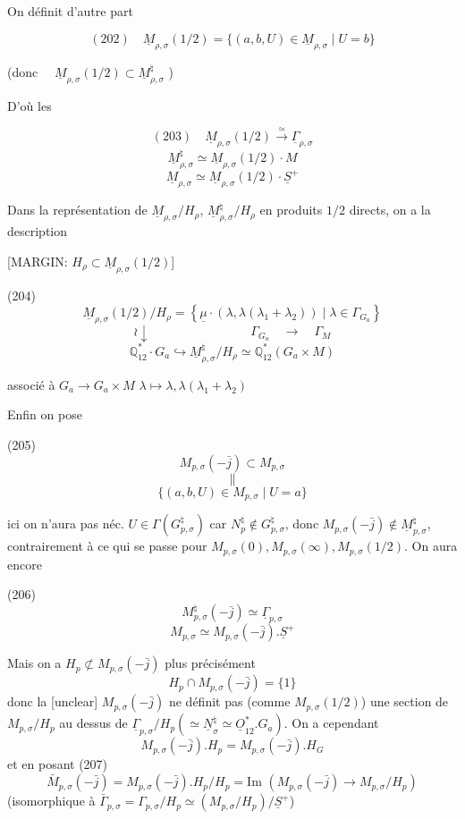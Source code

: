On définit d'autre part

$$ (202) \quad \underline{M}_{\rho, \sigma}(1/2) = \{ (a, b, U) \in \underline{M}_{\rho, \sigma} \mid U = b \} $$

(donc $\quad \underline{M}_{\rho, \sigma}(1/2) \subset \underline{M}_{\rho, \sigma}^\natural$ )

D'où les

$$ (203) \quad \underline{M}_{\rho, \sigma}(1/2) \overset{\simeq}{\longrightarrow} \underline{\Gamma}_{\rho, \sigma} $$
$$ \underline{M}_{\rho, \sigma}^\natural \simeq \underline{M}_{\rho, \sigma}(1/2) \cdot M $$
$$ \underline{M}_{\rho, \sigma} \simeq \underline{M}_{\rho, \sigma}(1/2) \cdot \underline{S}^+ $$

Dans la représentation de $\underline{M}_{\rho, \sigma}/H_\rho$, $\underline{M}_{\rho, \sigma}^\natural/H_\rho$ en produits $1/2$ directs, on a la description

[MARGIN: $H_\rho \subset \underline{M}_{\rho, \sigma}(1/2)$]

(204)
$$ \underline{M}_{\rho, \sigma}(1/2) / H_\rho = \left\{ \underline{\mu} \cdot (\lambda, \lambda(\lambda_1 + \lambda_2)) \mid \lambda \in \Gamma_{G_a} \right\} $$
$$ \wr\downarrow \qquad \qquad \qquad \qquad \Gamma_{G_a} \quad \to \quad \Gamma_M $$
$$ \mathbb{Q}_{12}^* \cdot G_a \hookrightarrow \underline{M}_{\rho, \sigma}^\natural / H_\rho \simeq \mathbb{Q}_{12}^* (G_a \times M) $$

associé à $G_a \to G_a \times M$
$\lambda \mapsto \lambda, \lambda(\lambda_1+\lambda_2)$

\newpage


Enfin on pose

(205) $$M_{p,\sigma}(-\bar{j}) \subset M_{p,\sigma}$$
$$\|$$
$$\{ (a,b,U) \in M_{p,\sigma} \mid U=a \}$$

ici on n'aura pas néc. $U \in \Gamma(G_{p,\sigma}^\natural)$ car $N_p^\natural \notin G_{p,\sigma}^\natural$, donc $M_{p,\sigma}(-\bar{j}) \notin \underline{M}_{p,\sigma}^\natural$, contrairement à ce qui se passe pour $M_{p,\sigma}(0), M_{p,\sigma}(\infty), M_{p,\sigma}(1/2)$. On aura encore

(206) $$M_{p,\sigma}^\natural(-\bar{j}) \simeq \underline{\Gamma}_{p,\sigma}$$
$$M_{p,\sigma} \simeq M_{p,\sigma}(-\bar{j}) . \underline{S}^+$$

Mais on a $H_p \not\subset M_{p,\sigma}(-\bar{j})$
plus précisément
$$H_p \cap M_{p,\sigma}(-\bar{j}) = \{1\}$$
donc la [unclear] $M_{p,\sigma}(-\bar{j})$ ne définit pas (comme $M_{p,\sigma}(1/2)$) une section de $M_{p,\sigma}/H_p$ au dessus de $\underline{\Gamma}_{p,\sigma}/H_p (\simeq \underline{N}_\sigma^\natural \simeq \underline{O}_{12}^* . G_a)$. On a cependant
$$M_{p,\sigma}(-\bar{j}) . H_p = M_{p,\sigma}(-\bar{j}) . H_G$$
et en posant
(207) $$\bar{M}_{p,\sigma}(-\bar{j}) = M_{p,\sigma}(-\bar{j}) . H_p / H_p = \text{Im } (M_{p,\sigma}(-\bar{j}) \to M_{p,\sigma}/H_p)$$
(isomorphique à $\bar{\Gamma}_{p,\sigma} = \Gamma_{p,\sigma}/H_p \simeq (M_{p,\sigma}/H_p) / \underline{S}^+$)

